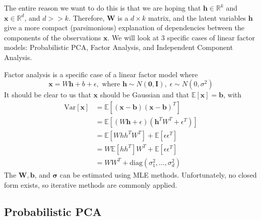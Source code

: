   The entire reason we want to do this is that we are hoping that $\mathbf{h} \in \mathbb{R}^k$ and $\mathbf{x} \in \mathbb{R}^d$, and $d >> k$. Therefore, $\mathbf{W}$ is a $d \times k$ matrix, and the latent variables $\mathbf{h}$ give a more compact (parsimonious)  explanation of dependencies between the components of the observations $\mathbf{x}$. We will look at 3 specific cases of linear factor models: Probabilistic PCA, Factor Analysis, and Independent Component Analysis. 

  \begin{definition} 
    Factor analysis is a specific case of a linear factor model where 
    \begin{equation}
      \mathbf{x} = W \mathbf{h} + b + \epsilon, \text{ where } \mathbf{h} \sim N(\mathbf{0}, \mathbf{I}), \; \epsilon \sim N(0, \sigma^2)
    \end{equation}
    It should be clear to us that $\mathbf{x}$ should be Gaussian and that $\mathbb{E}[\mathbf{x}] = \mathbf{b}$, with 
    \begin{align} 
        \mathrm{Var}[\mathbf{x}] & = \mathbb{E}[ (\mathbf{x} - \mathbf{b})( \mathbf{x} - \mathbf{b})^T ] \\
                                 & = \mathbb{E}[ (W \mathbf{h} + \epsilon) (\mathbf{h}^T W^T + \epsilon^T)] \\
                                 & = \mathbb{E}[W h h^T W^T] + \mathbb{E}[ \epsilon \epsilon^T] \\
                                 & = W \mathbb{E}[ h h^T] W^T + \mathbb{E}[ \epsilon \epsilon^T] \\
                                 & = W W^T + \mathrm{diag}(\sigma_1^2, \ldots, \sigma_d^2) 
    \end{align} 
    The $\mathbf{W}, \mathbf{b}$, and $\boldsymbol{\sigma}$ can be estimated using MLE methods. Unfortunately, no closed form  exists, so iterative methods are commonly applied. 
  \end{definition} 

\subsection{Probabilistic PCA}


